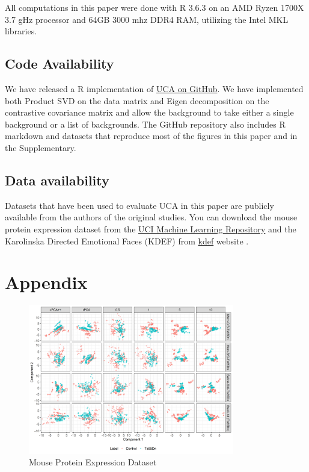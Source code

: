 \documentclass[12pt]{article}
\begin{document}
 All computations in this paper were done with R 3.6.3 \cite{baseR} on an AMD Ryzen 1700X 3.7 gHz processor and 64GB 3000 mhz DDR4 RAM, utilizing the Intel MKL libraries. 
 
 \subsection{Code Availability}
 We have released a R implementation of \href{https://github.com/rtud2/Residual-Dimension-Reduction/tree/master/uca}{UCA on GitHub}. We have implemented both Product SVD on the data matrix and Eigen decomposition on the contrastive covariance matrix and allow the background to take either a single background or a list of backgrounds. The GitHub repository also includes R markdown and datasets that reproduce most of the figures in this paper and in the Supplementary.
 
 \subsection{Data availability}
 Datasets that have been used to evaluate UCA in this paper are publicly available from the authors of the original studies. You can download the mouse protein expression dataset from the \href{https://archive.ics.uci.edu/ml/datasets/Mice+Protein+Expression}{UCI Machine Learning Repository} \cite{Higuera} and the Karolinska Directed Emotional Faces (KDEF) from \href{https://kdef.se/}{kdef} website  \cite{Calvo2008}.
 
\newpage
{}

\newpage
\section{Appendix}
\begin{figure}[!ht]
    \centering
	\includegraphics[width = 0.8\textwidth]{figure/Mouse_stack_cpc_rpcTs65Dn.png}
	\caption{Mouse Protein Expression Dataset}
	\label{fig:mouse_stack_cpca}
\end{figure}
\end{document}
